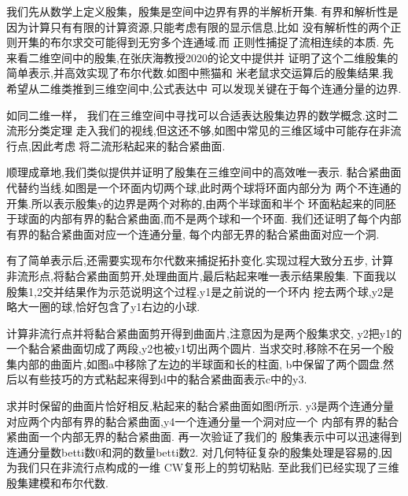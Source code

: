 \documentclass[UTF8]{ctexbeamer}	%
\theoremstyle{plain}
\theoremstyle{definition}
\theoremstyle{remark}
\numberwithin{equation}{section}
\begin{document}
\begin{frame}
  我们先从数学上定义殷集，殷集是空间中边界有界的半解析开集.
  有界和解析性是因为计算只有有限的计算资源,只能考虑有限的显示信息,比如
  没有解析性的两个正则开集的布尔求交可能得到无穷多个连通域.而
  正则性捕捉了流相连续的本质.
  先来看二维空间中的殷集,在张庆海教授2020的论文中提供并
  证明了这个二维殷集的简单表示,并高效实现了布尔代数.如图中熊猫和
  米老鼠求交运算后的殷集结果.我希望从二维类推到三维空间中,公式表达中
  可以发现关键在于每个连通分量的边界.
\end{frame}

\begin{frame}
  如同二维一样，
  我们在三维空间中寻找可以合适表达殷集边界的数学概念.这时二流形分类定理
  走入我们的视线,但这还不够,如图中常见的三维区域中可能存在非流行点,因此考虑
  将二流形粘起来的黏合紧曲面.
\end{frame}

\begin{frame}
  顺理成章地,我们类似提供并证明了殷集在三维空间中的高效唯一表示.
  黏合紧曲面代替约当线.如图是一个环面内切两个球,此时两个球将环面内部分为
  两个不连通的开集.所以表示殷集y的边界是两个对称的,由两个半球面和半个
  环面粘起来的同胚于球面的内部有界的黏合紧曲面,而不是两个球和一个环面.
  我们还证明了每个内部有界的黏合紧曲面对应一个连通分量,
  每个内部无界的黏合紧曲面对应一个洞.
\end{frame}

\begin{frame}
  有了简单表示后,还需要实现布尔代数来捕捉拓扑变化.实现过程大致分五步,
  计算非流形点,将黏合紧曲面剪开,处理曲面片,最后粘起来唯一表示结果殷集.
  下面我以殷集1,2交并结果作为示范说明这个过程.y1是之前说的一个环内
  挖去两个球,y2是略大一圈的球,恰好包含了y1右边的小球.
\end{frame}

\begin{frame}
  计算非流行点并将黏合紧曲面剪开得到曲面片,注意因为是两个殷集求交,
  y2把y1的一个黏合紧曲面切成了两段,y2也被y1切出两个圆片.
  当求交时,移除不在另一个殷集内部的曲面片,如图a中移除了左边的半球面和长的柱面,
  b中保留了两个圆盘.然后以有些技巧的方式粘起来得到d中的黏合紧曲面表示c中的y3.
\end{frame}

\begin{frame}
  求并时保留的曲面片恰好相反,粘起来的黏合紧曲面如图f所示.
  y3是两个连通分量对应两个内部有界的黏合紧曲面,y4一个连通分量一个洞对应一个
  内部有界的黏合紧曲面一个内部无界的黏合紧曲面.
  再一次验证了我们的
  殷集表示中可以迅速得到连通分量数betti数0和洞的数量betti数2.
  对几何特征复杂的殷集处理是容易的,因为我们只在非流行点构成的一维
  CW复形上的剪切粘贴.
  至此我们已经实现了三维殷集建模和布尔代数.
\end{frame}
\end{document}
